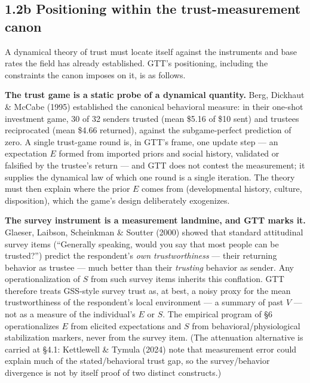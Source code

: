 \documentclass[11pt,twocolumn]{article}
\theoremstyle{gttdef}
\theoremstyle{gttplain}
\begin{document}
\subsection*{1.2b Positioning within the trust-measurement canon}

A dynamical theory of trust must locate itself against the instruments and base rates the field has already established. GTT's positioning, including the constraints the canon imposes on it, is as follows.

\textbf{The trust game is a static probe of a dynamical quantity.} Berg, Dickhaut \& McCabe (1995) established the canonical behavioral measure: in their one-shot investment game, 30 of 32 senders trusted (mean \$5.16 of \$10 sent) and trustees reciprocated (mean \$4.66 returned), against the subgame-perfect prediction of zero. A single trust-game round is, in GTT's frame, one update step --- an expectation $E$ formed from imported priors and social history, validated or falsified by the trustee's return --- and GTT does not contest the measurement; it supplies the dynamical law of which one round is a single iteration. The theory must then explain where the prior $E$ comes from (developmental history, culture, disposition), which the game's design deliberately exogenizes.

\textbf{The survey instrument is a measurement landmine, and GTT marks it.} Glaeser, Laibson, Scheinkman \& Soutter (2000) showed that standard attitudinal survey items (``Generally speaking, would you say that most people can be trusted?'') predict the respondent's \emph{own trustworthiness} --- their returning behavior as trustee --- much better than their \emph{trusting} behavior as sender. Any operationalization of $S$ from such survey items inherits this conflation. GTT therefore treats GSS-style survey trust as, at best, a noisy proxy for the mean trustworthiness of the respondent's local environment --- a summary of past $V$ --- not as a measure of the individual's $E$ or $S.$ The empirical program of \S{}6 operationalizes $E$ from elicited expectations and $S$ from behavioral/physiological stabilization markers, never from the survey item. (The attenuation alternative is carried at \S{}4.1: Kettlewell \& Tymula (2024) note that measurement error could explain much of the stated/behavioral trust gap, so the survey/behavior divergence is not by itself proof of two distinct constructs.)
\end{document}
